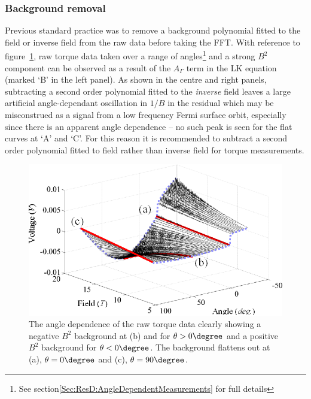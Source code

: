 \subsubsection{Background removal}

Previous standard practice was to remove a background polynomial fitted to the field or inverse field from the raw data before taking the \ac{FFT}. With reference to figure~\ref{Fig:Exp:RawPlotAngleDependence}, raw torque data taken over a range of angles\footnote{See section\ref{Sec:ResD:AngleDependentMeasurements} for full details} and a strong $B^2$ component can be observed as a result of the $A_{\Gamma}$ term in the \ac{LK} equation (marked `B' in the left panel). As shown in the centre and right panels, subtracting a second order polynomial fitted to the \emph{inverse} field leaves a large artificial angle-dependant oscillation in $1/B$ in the residual which may be misconstrued as a signal from a low frequency Fermi surface orbit, especially since there is an apparent angle dependence -- no such peak is seen for the flat curves at `A' and `C'. For this reason it is recommended to subtract a second order polynomial fitted to field rather than inverse field for torque measurements.
\begin{figure}[htbp]
    \begin{center}
        \includegraphics[scale=1.1]{Chapter-ExperimentalTechnique/Figures/ComparisonBackgroundSubtraction/RawPlotAngleDependence}
        \caption{The angle dependence of the raw torque data clearly showing a negative $B^2$ background at (b) and for $\theta>0\degree$ and a positive $B^2$ background for $\theta<0\degree$. The background flattens out at (a), $\theta = 0\degree$ and (c), $\theta=90\degree$.}
        \label{Fig:Exp:RawPlotAngleDependence}
    \end{center}
\end{figure}

